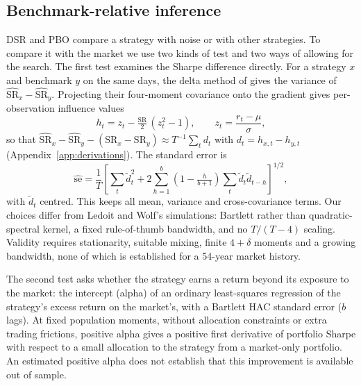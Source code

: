 \documentclass[11pt,a4paper]{article}
\newcommand{\SR}{\mathrm{SR}}
\newcommand{\hSR}{\widehat{\mathrm{SR}}}
\begin{document}
\subsection{Benchmark-relative inference}
DSR and PBO compare a strategy with noise or with other strategies. To compare it with the market we use two kinds of test and two ways of allowing for the search. The first test examines the Sharpe difference directly. For a strategy $x$ and benchmark $y$ on the same days, the delta method of \citet[Eqs.~1--5, p.~4, working paper]{ledoit2008} gives the variance of $\hSR_x-\hSR_y$. Projecting their four-moment covariance onto the gradient gives per-observation influence values
\begin{equation}\label{eq:influence}
h_t=z_t-\tfrac{\SR}{2}\,(z_t^2-1),\qquad z_t=\frac{r_t-\mu}{\sigma},
\end{equation}
so that $\hSR_x-\hSR_y-(\SR_x-\SR_y)\approx T^{-1}\sum_t d_t$ with $d_t=h_{x,t}-h_{y,t}$ (Appendix~\ref{app:derivations}). The standard error is
\begin{equation}\label{eq:hac}
\widehat{\mathrm{se}}=\frac1T\left[\sum_t\tilde d_t^2+2\sum_{h=1}^{b}\left(1-\tfrac{h}{b+1}\right)\sum_t\tilde d_t\tilde d_{t-h}\right]^{1/2},
\end{equation}
with $\tilde d_t$ centred. This keeps all mean, variance and cross-covariance terms. Our choices differ from Ledoit and Wolf's simulations: Bartlett rather than quadratic-spectral kernel, a fixed rule-of-thumb bandwidth, and no $T/(T-4)$ scaling. Validity requires stationarity, suitable mixing, finite $4+\delta$ moments and a growing bandwidth, none of which is established for a 54-year market history.

The second test asks whether the strategy earns a return beyond its exposure to the market: the intercept (alpha) of an ordinary least-squares regression of the strategy's excess return on the market's, with a Bartlett HAC standard error ($b$ lags). At fixed population moments, without allocation constraints or extra trading frictions, positive alpha gives a positive first derivative of portfolio Sharpe with respect to a small allocation to the strategy from a market-only portfolio. An estimated positive alpha does not establish that this improvement is available out of sample.
\end{document}
